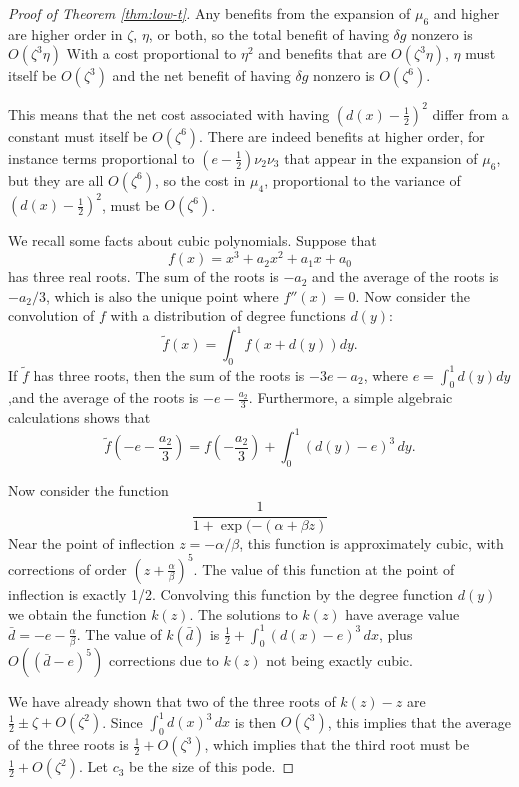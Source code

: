 \documentclass[12pt]{amsart}
\newcommand{\1}{\mathbf{1}}
\begin{document}
\begin{proof}[Proof of Theorem \ref{thm:low-t}]
Any benefits from the 
expansion of $\mu_6$ and higher are higher order in $\zeta$, $\eta$, or both, so the total benefit of having 
$\delta g$ nonzero is $O(\zeta^3\eta)$
With a cost proportional to 
$\eta^2$ and benefits that are $O(\zeta^3\eta)$, $\eta$ must itself be $O(\zeta^3)$ and the net benefit of having 
$\delta g$ nonzero is $O(\zeta^6)$. 

This means that the net cost associated with having $(d(x)-\frac12)^2$ differ from a constant must itself be $O(\zeta^6)$. 
There are indeed benefits at higher order, for instance terms proportional to $(e-\frac12) \nu_2\nu_3$ that appear in the
expansion of $\mu_6$, but they are all $O(\zeta^6)$, so the cost in $\mu_4$, proportional to the variance of 
$(d(x)-\frac12)^2$, must be $O(\zeta^6)$. 

\smallskip

 We recall some facts about cubic polynomials. Suppose that 
\begin{equation}
f(x) = x^3 + a_2 x^2 + a_1 x + a_0 
\end{equation}
has three real roots. The sum of the roots is $-a_2$ and the average of the roots is $-a_2/3$, which is also the unique
point where $f''(x)=0$. Now consider the convolution of $f$ with a distribution of degree functions $d(y)$:
\begin{equation}
\tilde f(x) = \int_0^1 f(x+d(y)) dy.
\end{equation}
If $\tilde f$ has three roots, then the sum of the roots is $-3e-a_2$, where $e = \int_0^1 d(y) dy$ ,and the average of 
the roots is $-e - \frac{a_2}{3}$. Furthermore, a simple algebraic calculations shows that 
\begin{equation} 
\tilde f(-e - \frac{a_2}{3}) = f(-\frac{a_2}{3}) + \int_0^1 (d(y)-e)^3 \, dy.
\end{equation}

Now consider the function 
\[ \frac{1}{1 + \exp(-(\alpha + \beta z)} \]
Near the point of inflection $z=-\alpha/\beta$, this function is approximately cubic, with corrections of order 
$(z + \frac{\alpha}{\beta})^5$. The value of this function at the point of inflection is exactly 1/2. 
Convolving this function by the degree function $d(y)$ we obtain the function $k(z)$. The solutions to $k(z)$ have average
value $\bar d = -e - \frac{\alpha}{\beta}$. The value of $k(\bar d)$ is $\frac12 + \int_0^1 (d(x)-e)^3 \, dx$, plus
$O((\bar d-e)^5)$ corrections due to $k(z)$ not being exactly cubic. 

We have already shown that two of the three roots of $k(z)-z$ are $\frac12 \pm \zeta + O(\zeta^2)$. Since 
$\int_0^1 d(x)^3 \, dx$ is then $O(\zeta^3)$, this implies that the average of the three roots is $\frac12 + O(\zeta^3)$,
which implies that the third root must be $\frac12 + O(\zeta^2)$. Let $c_3$ be the size of this pode. 


\end{proof}
\end{document}
